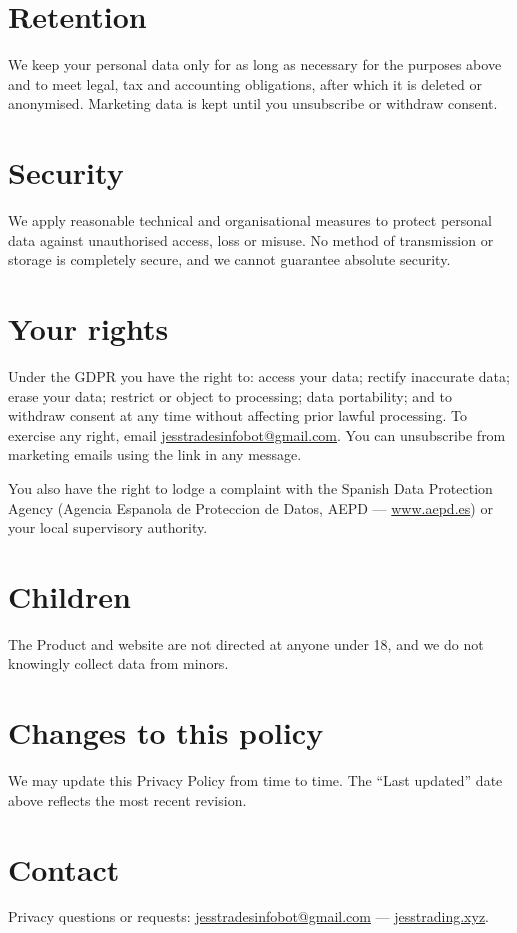 \documentclass[11pt,a4paper]{article}
\begin{document}
\section{Retention}
We keep your personal data only for as long as necessary for the purposes above and to meet legal,
tax and accounting obligations, after which it is deleted or anonymised. Marketing data is kept
until you unsubscribe or withdraw consent.

\section{Security}
We apply reasonable technical and organisational measures to protect personal data against
unauthorised access, loss or misuse. No method of transmission or storage is completely secure, and
we cannot guarantee absolute security.

\section{Your rights}
Under the GDPR you have the right to: access your data; rectify inaccurate data; erase your data;
restrict or object to processing; data portability; and to withdraw consent at any time without
affecting prior lawful processing. To exercise any right, email
\href{mailto:jesstradesinfobot@gmail.com}{jesstradesinfobot@gmail.com}. You can unsubscribe from
marketing emails using the link in any message.

You also have the right to lodge a complaint with the Spanish Data Protection Agency (Agencia
Espanola de Proteccion de Datos, AEPD --- \href{https://www.aepd.es}{www.aepd.es}) or your local
supervisory authority.

\section{Children}
The Product and website are not directed at anyone under 18, and we do not knowingly collect data
from minors.

\section{Changes to this policy}
We may update this Privacy Policy from time to time. The ``Last updated'' date above reflects the
most recent revision.

\section{Contact}
Privacy questions or requests:
\href{mailto:jesstradesinfobot@gmail.com}{jesstradesinfobot@gmail.com} ---
\href{https://jesstrading.xyz}{jesstrading.xyz}.
\end{document}
